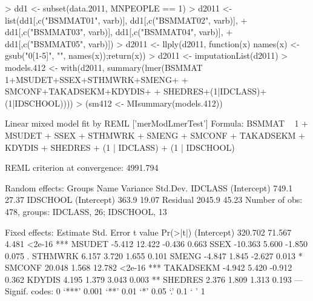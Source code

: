 \documentclass[a4paper]{article}
\begin{document}
\begin{Schunk}
\begin{Sinput}
> dd1 <- subset(data.2011, MNPEOPLE == 1)
> d2011 <- list(dd1[,c("BSMMAT01", varb)], dd1[,c("BSMMAT02", varb)], 
+               dd1[,c("BSMMAT03", varb)], dd1[,c("BSMMAT04", varb)],
+               dd1[,c("BSMMAT05", varb)])
> d2011 <- llply(d2011, function(x) {names(x) <- gsub("0[1-5]", "", names(x));return(x)})
> d2011 <- imputationList(d2011)
> models.412 <- with(d2011, summary(lmer(BSMMAT ~ 1+MSUDET+SSEX+STHMWRK+SMENG+
+                                          SMCONF+TAKADSEKM+KDYDIS+
+                                          SHEDRES+(1|IDCLASS)+(1|IDSCHOOL))))
> (sm412 <- MIsummary(models.412))
\end{Sinput}
\begin{Soutput}
Linear mixed model fit by REML ['merModLmerTest']
Formula: BSMMAT ~ 1 + MSUDET + SSEX + STHMWRK + SMENG + SMCONF + TAKADSEKM +      KDYDIS + SHEDRES + (1 | IDCLASS) + (1 | IDSCHOOL) 

REML criterion at convergence: 4991.794 

Random effects:
 Groups   Name        Variance Std.Dev.
 IDCLASS  (Intercept)  749.1   27.37   
 IDSCHOOL (Intercept)  363.9   19.07   
 Residual             2045.9   45.23   
Number of obs: 478, groups: IDCLASS, 26; IDSCHOOL, 13

Fixed effects:
            Estimate Std. Error t value Pr(>|t|)    
(Intercept)  320.702     71.567   4.481   <2e-16 ***
MSUDET        -5.412     12.422  -0.436    0.663    
SSEX         -10.363      5.600  -1.850    0.075 .  
STHMWRK        6.157      3.720   1.655    0.101    
SMENG         -4.847      1.845  -2.627    0.013 *  
SMCONF        20.048      1.568  12.782   <2e-16 ***
TAKADSEKM     -4.942      5.420  -0.912    0.362    
KDYDIS         4.195      1.379   3.043    0.003 ** 
SHEDRES        2.376      1.809   1.313    0.193    
---
Signif. codes:  0 ‘***’ 0.001 ‘**’ 0.01 ‘*’ 0.05 ‘.’ 0.1 ‘ ’ 1


\end{Soutput}
\end{Schunk}
\end{document}
